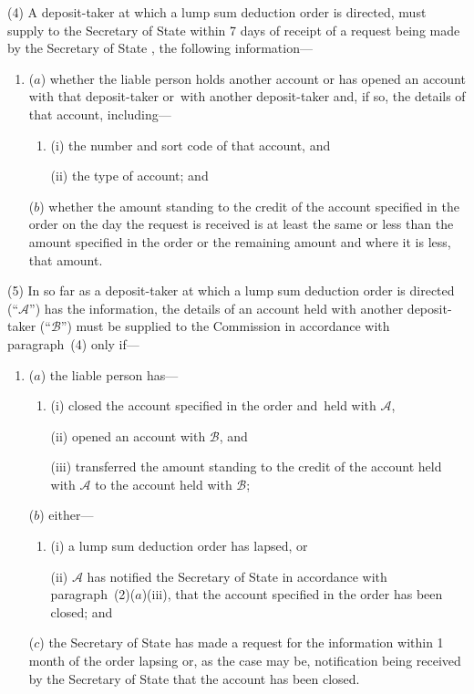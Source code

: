 \documentclass[12pt,a4paper]{article}
\begin{document}
(4) A deposit-taker at which a lump sum deduction order is directed, must supply to the 
Secretary of State  %
within 7 days of receipt of a request being made by the 
Secretary of State%
, the following information—
\begin{enumerate}\item[]
($a$) whether the liable person holds another account or has opened an account with that deposit-taker or~with another deposit-taker and, if so, the details of that account, including—
\begin{enumerate}\item[]
(i) the number and sort code of that account, and

(ii) the type of account; and
\end{enumerate}

($b$) whether the amount standing to the credit of the account specified in the order on the day the request is received is at least the same or less than the amount specified in the order or the remaining amount and where it is less, that amount.
\end{enumerate}

(5) In so far as a deposit-taker at which a lump sum deduction order is directed (“$\mathcal{A}$”) has the information, the details of an account held with another deposit-taker (“$\mathcal{B}$”) must be supplied to the Commission in accordance with paragraph~(4) only if—
\begin{enumerate}\item[]
($a$) the liable person has—
\begin{enumerate}\item[]
(i) closed the account specified in the order and~held with $\mathcal{A}$,

(ii) opened an account with $\mathcal{B}$, and

(iii) transferred the amount standing to the credit of the account held with $\mathcal{A}$ to the account held with $\mathcal{B}$;
\end{enumerate}

($b$) either—
\begin{enumerate}\item[]
(i) a lump sum deduction order has lapsed, or

\begin{sloppypar}
(ii) $\mathcal{A}$ has notified the 
Secretary of State  %
in accordance with paragraph~(2)($a$)(iii), that the account specified in the order has been closed; and
\end{sloppypar}
\end{enumerate}

($c$) the 
Secretary of State  %
has made a request for the information within 1 month of the order lapsing or, as the case may be, notification being received by the 
Secretary of State  %
that the account has been closed.
\end{enumerate}
\end{document}
